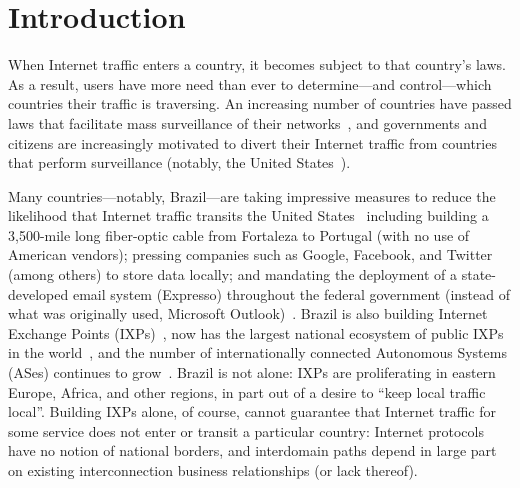 \section{Introduction}
\label{intro}

When Internet traffic enters a country, it becomes subject to that
country's laws.  As a result, users have more need than ever to
determine---and control---which countries their traffic is traversing.
An increasing number of countries have passed laws that facilitate mass
surveillance of their networks~\cite{france_surveillance,
  netherlands_surveillance, kazak_surveillance, uk_bill}, and governments
and citizens are increasingly motivated to divert their Internet traffic
from countries that perform surveillance (notably, the United
States~\cite{russia_secure_internet,
  routing_errors, dte}).

Many countries---notably, Brazil---are taking impressive measures to
reduce the likelihood that Internet traffic transits the United
States~\cite{brazil_history, brazil_break_from_US, brazil_conference,
  brazil_conference2, brazil_human_rights} including building a
3,500-mile long fiber-optic cable from Fortaleza to Portugal (with no
use of American vendors); pressing companies such as Google, Facebook,
and Twitter (among others) to store data locally; and mandating the
deployment of a state-developed email system (Expresso) throughout the
federal government (instead of what was originally used, Microsoft
Outlook)~\cite{brazil_cable, brazil_us_companies}.  Brazil is also
building Internet Exchange Points (IXPs)~\cite{brazil_IXP1}, now has the
largest national ecosystem of public IXPs in the
world~\cite{brazil_ixp_ecosystem}, and the number of internationally
connected Autonomous Systems (ASes) continues to
grow~\cite{brazil_international_ases}. Brazil is not alone: IXPs are
proliferating in eastern Europe, Africa, and other regions, in part out
of a desire to ``keep local traffic local''. Building IXPs alone, of
course, cannot guarantee that Internet traffic for some service does not
enter or transit a particular country: Internet protocols have no notion
of national borders, and interdomain paths depend in large part on
existing interconnection business relationships (or lack thereof).

